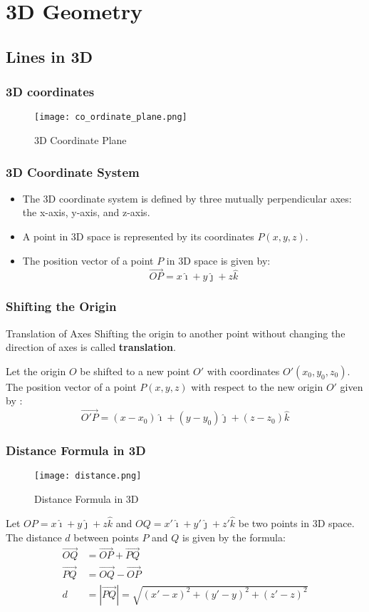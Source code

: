 \section{3D Geometry}
\label{sec:3d_geometry}

\subsection{Lines in 3D}
\begin{frame}
    \frametitle{3D coordinates}
    \begin{figure}
        \texttt{[image: co\_ordinate\_plane.png]}
        \caption{3D Coordinate Plane}
    \end{figure}
\end{frame}

\begin{frame}
    \frametitle{3D Coordinate System}
    \begin{itemize}
        \item The 3D coordinate system is defined by three mutually perpendicular axes: the x-axis, y-axis, and z-axis.
        \item A point in 3D space is represented by its coordinates \(P(x, y, z)\).
        \item The position vector of a point \(P\) in 3D space is given by:
        \[
        \vec{OP} = x\hat{\imath} + y\hat{\jmath} + z\hat{k}
        \]
    \end{itemize}       
\end{frame}

\begin{frame}
    \frametitle{Shifting the Origin}
    \begin{block}{Translation of Axes}
        Shifting the origin  to another point without changing the direction of axes is called \textbf{translation}.
    \end{block}
   Let the origin \(O\) be shifted to a new point \(O'\) with coordinates \(O'(x_0, y_0, z_0)\). The position vector of a point \(P(x,y,z)\) with respect to the new origin \(O'\) given by :
    \[
        \vec{O'P} = (x - x_0)\hat{\imath} + (y - y_0)\hat{\jmath} + (z - z_0)\hat{k}
    \]
\end{frame}

\begin{frame}
\frametitle{Distance Formula in 3D}
\begin{figure}
    \texttt{[image: distance.png]}
    \caption{Distance Formula in 3D}
\end{figure}
Let \(OP = x \hat{\imath} + y \hat{\jmath} + z \hat{k}\)  and \(OQ = x' \hat{\imath} + y' \hat{\jmath} + z' \hat{k}\) be two points in 3D space. The distance \(d\) between points \(P\) and \(Q\) is given by the formula:
\begin{align*}
    \vec{OQ} &= \vec{OP} + \vec{PQ} \\
    \vec{PQ} &= \vec{OQ} - \vec{OP} \\
    d &= |\vec{PQ}| = \sqrt{(x' - x)^2 + (y' - y)^2 + (z' - z)^2}
\end{align*}
\end{frame}

